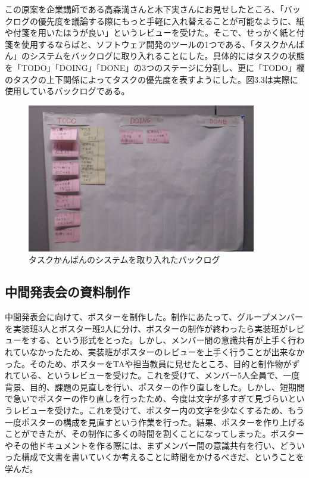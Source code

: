 \documentclass[openany,11pt,papersize]{jsbook}
\begin{document}
\par この原案を企業講師である高森満さんと木下実さんにお見せしたところ、「バックログの優先度を議論する際にもっと手軽に入れ替えることが可能なように、紙や付箋を用いたほうが良い」というレビューを受けた。そこで、せっかく紙と付箋を使用するならばと、ソフトウェア開発のツールの1つである、「タスクかんばん」のシステムをバックログに取り入れることにした。具体的にはタスクの状態を「TODO」「DOING」「DONE」の3つのステージに分割し、更に「TODO」欄のタスクの上下関係によってタスクの優先度を表すようにした。図3.3は実際に使用しているバックログである。

\begin{figure}[H]
\begin{center}
\includegraphics[width=10cm, bb=0 0 1206 783]{img/TaskKanban.png}
\end{center}
\caption{タスクかんばんのシステムを取り入れたバックログ}
\end{figure}


\subsection{中間発表会の資料制作}
\par 中間発表会に向けて、ポスターを制作した。制作にあたって、グループメンバーを実装班3人とポスター班2人に分け、ポスターの制作が終わったら実装班がレビューをする、という形式をとった。しかし、メンバー間の意識共有が上手く行われていなかったため、実装班がポスターのレビューを上手く行うことが出来なかった。そのため、ポスターをTAや担当教員に見せたところ、目的と制作物がずれている、というレビューを受けた。これを受けて、メンバー5人全員で、一度背景、目的、課題の見直しを行い、ポスターの作り直しをした。しかし、短期間で急いでポスターの作り直しを行ったため、今度は文字が多すぎて見づらいというレビューを受けた。これを受けて、ポスター内の文字を少なくするため、もう一度ポスターの構成を見直すという作業を行った。結果、ポスターを作り上げることができたが、その制作に多くの時間を割くことになってしまった。ポスターやその他ドキュメントを作る際には、まずメンバー間の意識共有を行い、どういった構成で文書を書いていくか考えることに時間をかけるべきだ、ということを学んだ。
\end{document}
